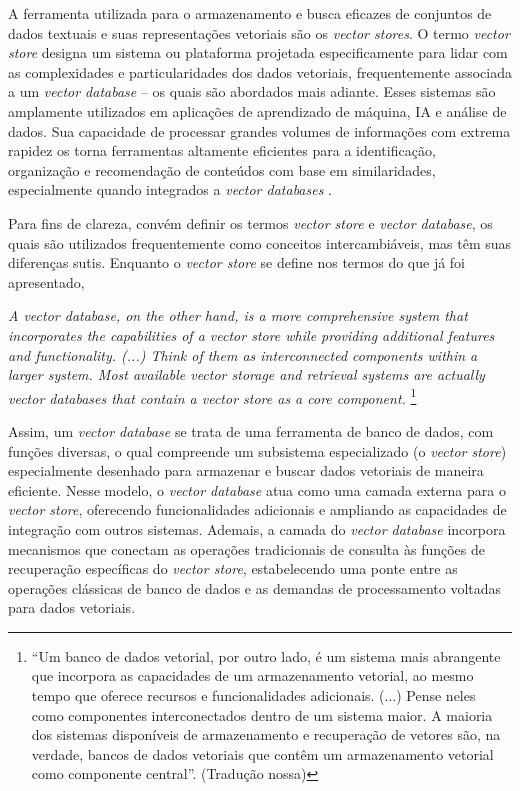 A ferramenta utilizada para o armazenamento e busca eficazes de conjuntos de dados textuais e suas representações vetoriais são os \textit{vector stores}. O termo \textit{vector store} designa  um sistema ou plataforma projetada especificamente para lidar com as complexidades e particularidades dos dados vetoriais, frequentemente associada a um \textit{vector database} -- os quais são abordados mais adiante. Esses sistemas são amplamente utilizados em aplicações de aprendizado de máquina, \ac{IA} e análise de dados. Sua capacidade de processar grandes volumes de informações com extrema rapidez os torna ferramentas altamente eficientes para a identificação, organização e recomendação de conteúdos com base em similaridades, especialmente quando integrados a \textit{vector databases} \cite{Bancos-Vetoriais:2}.

Para fins de clareza, convém definir os termos \textit{vector store} e \textit{vector database}, os quais são utilizados frequentemente como conceitos intercambiáveis, mas têm suas diferenças sutis. Enquanto o \textit{vector store} se define nos termos do que já foi apresentado,
\begin{citacao}
    \textit{A vector database, on the other hand, is a more comprehensive system that incorporates the capabilities of a vector store while providing additional features and functionality. (...) Think of them as interconnected components within a larger system. Most available vector storage and retrieval systems are actually vector databases that contain a vector store as a core component.} \cite{Bancos-Vetoriais:3} \footnote{``Um banco de dados vetorial, por outro lado, é um sistema mais abrangente que incorpora as capacidades de um armazenamento vetorial, ao mesmo tempo que oferece recursos e funcionalidades adicionais. (...) Pense neles como componentes interconectados dentro de um sistema maior. A maioria dos sistemas disponíveis de armazenamento e recuperação de vetores são, na verdade, bancos de dados vetoriais que contêm um armazenamento vetorial como componente central''. (Tradução nossa)} 
\end{citacao}

Assim, um \textit{vector database} se trata de uma ferramenta de banco de dados, com funções diversas, o qual compreende um subsistema especializado (o \textit{vector store}) especialmente desenhado para armazenar e buscar dados vetoriais de maneira eficiente. Nesse modelo, o \textit{vector database} atua como uma camada externa para o \textit{vector store}, oferecendo funcionalidades adicionais e ampliando as capacidades de integração com outros sistemas. Ademais, a camada do \textit{vector database} incorpora mecanismos que conectam as operações tradicionais de consulta às funções de recuperação específicas do \textit{vector store}, estabelecendo uma ponte entre as operações clássicas de banco de dados e as demandas de processamento voltadas para dados vetoriais.


